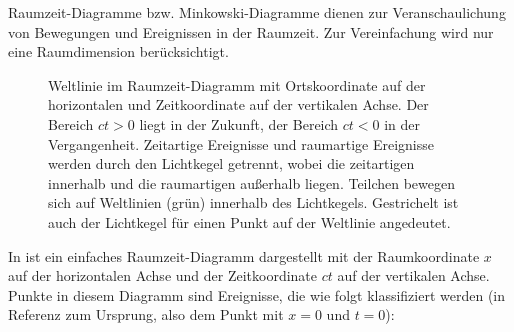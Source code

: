 Raumzeit-Diagramme bzw. Minkowski-Diagramme dienen zur Veranschaulichung von Bewegungen und Ereignissen in der Raumzeit.
Zur Vereinfachung wird nur eine Raumdimension berücksichtigt.

\begin{figure}[htp]
    \centering
    \tfigMinkowskiDiagramA
    \caption{Weltlinie im Raumzeit-Diagramm mit Ortskoordinate auf der horizontalen und Zeitkoordinate auf der vertikalen Achse.
        Der Bereich $ct>0$ liegt in der Zukunft, der Bereich $ct<0$ in der Vergangenheit.
        Zeitartige Ereignisse und raumartige Ereignisse werden durch den Lichtkegel getrennt, wobei die zeitartigen innerhalb und die raumartigen außerhalb liegen.
        Teilchen bewegen sich auf Weltlinien (grün) innerhalb des Lichtkegels. Gestrichelt ist auch der Lichtkegel für einen Punkt auf der Weltlinie angedeutet. }
    \label{fig:minkowski_diagram}
\end{figure}

In  ist ein einfaches Raumzeit-Diagramm dargestellt mit der Raumkoordinate $x$ auf der horizontalen Achse und der Zeitkoordinate $ct$ auf der vertikalen Achse.
Punkte in diesem Diagramm sind Ereignisse, die wie folgt klassifiziert werden (in Referenz zum Ursprung, also dem Punkt mit $x=0$ und $t=0$):

